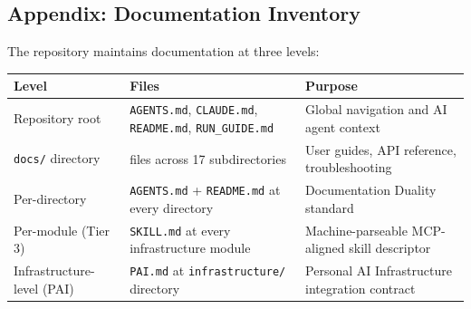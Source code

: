 \documentclass[
]{article}
\newcounter{none} %
\begin{document}
\newpage

\newpage

\subsection{Appendix: Documentation Inventory}\label{appendix-docs}

The repository maintains documentation at three levels:

\begin{table}[h]
\caption{Documentation inventory across the four-layer documentation architecture, from repository-wide system files to per-module skill descriptors.}
\label{tab:documentation-inventory}
\end{table}

{\def\LTcaptype{none} %
\begin{longtable}[]{@{}
  >{\raggedright\arraybackslash}p{}
  >{\centering\arraybackslash}p{}
  >{\raggedright\arraybackslash}p{}@{}}
\toprule\noalign{}
\begin{minipage}[b]{\linewidth}\raggedright
Level
\end{minipage} & \begin{minipage}[b]{\linewidth}\centering
Files
\end{minipage} & \begin{minipage}[b]{\linewidth}\raggedright
Purpose
\end{minipage} \\
\midrule\noalign{}
\endhead
\bottomrule\noalign{}
\endlastfoot
Repository root & \texttt{AGENTS.md}, \texttt{CLAUDE.md},
\texttt{README.md}, \texttt{RUN\_GUIDE.md} & Global navigation and AI
agent context \\
\texttt{docs/} directory & 380 files across 17 subdirectories & User
guides, API reference, troubleshooting \\
Per-directory & \texttt{AGENTS.md} + \texttt{README.md} at every
directory & Documentation Duality standard \\
Per-module (Tier 3) & \texttt{SKILL.md} at every infrastructure module &
Machine-parseable MCP-aligned skill descriptor \\
Infrastructure-level (PAI) & \texttt{PAI.md} at \texttt{infrastructure/}
directory & Personal AI Infrastructure integration contract \\
\end{longtable}
}
\end{document}
